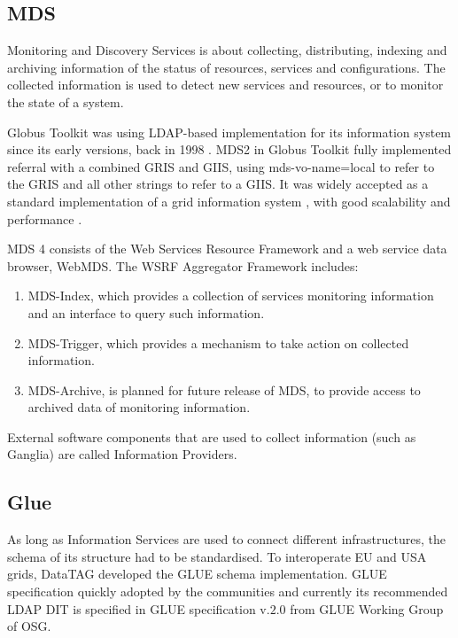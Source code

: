 \subsection{MDS}
Monitoring and Discovery Services is about collecting, distributing, indexing and archiving information of the status of resources, services and configurations. The collected information is used to detect new services and resources, or to monitor the state of a system.

Globus Toolkit was using LDAP-based implementation for its information system since its early versions, back in 1998 \cite{von1998usage}. MDS2 in Globus Toolkit fully implemented referral with a combined GRIS and GIIS, using mds-vo-name=local to refer to the GRIS and all other strings to refer to a GIIS. It was widely accepted as a standard implementation of a grid information system \cite{945188}, with good scalability and performance \cite{zhang2004performance}.


MDS 4 consists of the Web Services Resource Framework and a web service data browser, WebMDS. The WSRF Aggregator Framework includes:

\begin{enumerate}
  \item MDS-Index, which provides a collection of services monitoring information and an interface to query such information.
  \item MDS-Trigger, which provides a mechanism to take action on collected information.
  \item MDS-Archive, is planned for future release of MDS, to provide access to archived data of monitoring information.
\end{enumerate}

External software components that are used to collect information (such as Ganglia)\cite{gangliaWSRF} are called Information Providers.


\subsection{Glue}
As long as Information Services are used to connect different infrastructures, the schema of its structure had to be standardised. To interoperate EU and USA grids, DataTAG developed the GLUE schema implementation. GLUE specification quickly adopted by the communities and currently its recommended LDAP DIT is specified in GLUE specification v.$2.0$ from GLUE Working Group of OSG.

